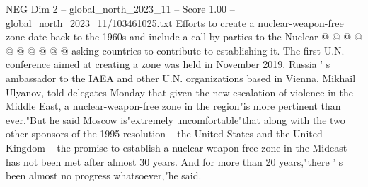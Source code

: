 \begin{textsample}{NEG Dim 2 – global\_north\_2023\_11 – Score 1.00 – global\_north\_2023\_11/103461025.txt}
Efforts to create a nuclear-weapon-free zone date back to the 1960s and include a call by parties to the Nuclear @ @ @ @ @ @ @ @ @ @ asking countries to contribute to establishing it.
The first U.N. conference aimed at creating a zone was held in November 2019.
Russia ' s ambassador to the IAEA and other U.N. organizations based in Vienna, Mikhail Ulyanov, told delegates Monday that given the new escalation of violence in the Middle East, a nuclear-weapon-free zone in the region"is more pertinent than ever."But he said Moscow is"extremely uncomfortable"that along with the two other sponsors of the 1995 resolution -- the United States and the United Kingdom -- the promise to establish a nuclear-weapon-free zone in the Mideast has not been met after almost 30 years.
And for more than 20 years,"there ' s been almost no progress whatsoever,"he said.

\end{textsample}
